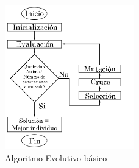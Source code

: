	\begin{figure}[!h]
		\centering
		\includegraphics[width=0.50\textwidth]{images/chapter_2/AG}
		\caption{Algoritmo Evolutivo básico}
		\label{fig:AG}
	\end{figure}




%
%
%
%
